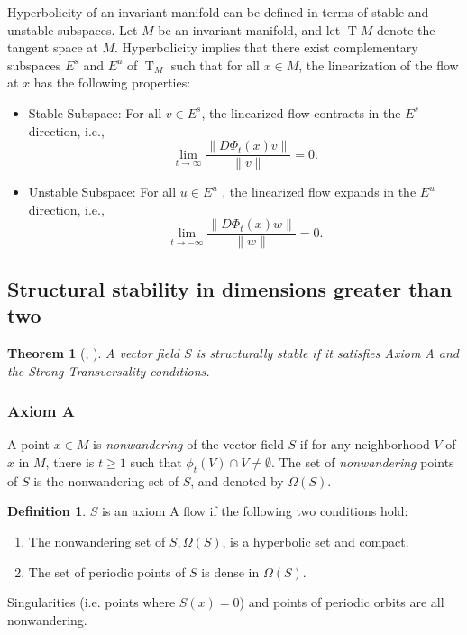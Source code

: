 \documentclass{article}
\newtheorem{theorem}{Theorem}
\theoremstyle{definition}
\newtheorem{definition}{Definition}
\theoremstyle{remark}
\newcommand{\T}{\operatorname{T}}
\newcommand{\TM}{\T\!M}
\newcounter{ct}
\begin{document}
Hyperbolicity of an invariant manifold can be defined in terms of stable and unstable subspaces. Let $M$ be an invariant manifold, and let $\TM$  denote the tangent space at $M$. Hyperbolicity implies that there exist complementary subspaces $E^s$  and $E^u$  of $\T_M$  such that for all $x\in M$, the linearization of the flow at $x$ has the following properties:
\begin{itemize}
\item Stable Subspace: For all $v\in E^s$, the linearized flow contracts in the $E^s$  direction, i.e., \[\lim_{t \to \infty} \frac{\|D\Phi_t(x)v\|}{\|v\|} = 0.\]
\item Unstable Subspace: For all $u\in E^u$ , the linearized flow expands in the $E^u$ direction, i.e., \[\lim_{t \to -\infty} \frac{\|D\Phi_t(x)w\|}{\|w\|} = 0.\]
\end{itemize}




\subsection{Structural stability in dimensions greater than two}
\begin{theorem}[\cite{robbin1971ss}, \cite{robinson1974ss}]\label{theorem:ss}
A vector field $S$ is structurally stable if it satisfies Axiom A and the Strong Transversality conditions.
\end{theorem}

\subsubsection{Axiom A}
A point $x\in M$ is \emph{nonwandering} of the vector field $S$ if for any neighborhood $V$ of $x$ in $M$, there is $t\geq 1$ such that $\phi_t(V) \cap V\neq \emptyset$. The set of \emph{nonwandering} points of $S$ is the nonwandering set of $S$, and denoted by $\Omega(S)$. 

\begin{definition}
$S$ is an axiom A flow if the following two conditions hold:
\begin{enumerate}
\item The nonwandering set of $S, \Omega(S)$, is a hyperbolic set and compact.
\item The set of periodic points of $S$ is dense in $\Omega(S)$.
\end{enumerate}
\end{definition}

Singularities (i.e. points where $S(x)=0$) and points of periodic orbits are all nonwandering.
\end{document}
